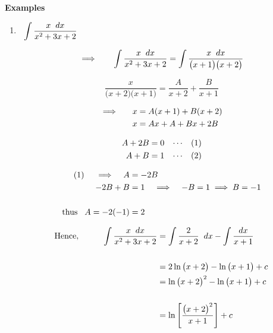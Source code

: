 \documentclass[11pt,a4paper]{article}
\begin{document}
\textbf{Examples}
\begin{enumerate}
\item $\hspace{0.2cm}\displaystyle{\int \dfrac{x\hspace{0.2cm}dx}{x^2 + 3x + 2}}$

$$\implies \hspace{0.6cm} \int \dfrac{x\hspace{0.2cm}dx}{x^2 + 3x + 2} = \int \dfrac{x\hspace{0.2cm}dx}{\big( x + 1\big)\big( x + 2\big)}$$

$$\dfrac{x}{\big(x + 2\big)\big(x + 1\big)} = \dfrac{A}{x + 2} + \dfrac{B}{x + 1}$$


\begin{align*}
\implies\hspace{0.5cm} x & = A(x+1) + B(x+ 2)\\
x & = Ax + A + Bx + 2B
\end{align*}


\begin{align*}
A + 2B & = 0\hspace{0.3cm} \cdots\hspace{0.3cm} (1)\\
A + B & = 1\hspace{0.3cm} \cdots\hspace{0.3cm} (2)
\end{align*}


\begin{align*}
(1)\hspace{0.4cm} \implies\hspace{0.3cm} A & = -2B\\
-2B + B & = 1\hspace{0.3cm} \implies\hspace{0.3cm} -B = 1\implies B = -1\\\\
\text{thus}\hspace{0.3cm} A = -2(-1) & = 2
\end{align*}





\begin{align*}
\text{Hence},\hspace{1cm} \int \dfrac{x\hspace{0.2cm}dx}{x^2 + 3x + 2} & = \int \dfrac{2}{x + 2} \hspace{0.2cm}dx - \int \dfrac{dx}{x + 1}\\\\
& = 2\ln \big( x + 2\big) - \ln \big(x + 1\big) + c\\
& = \ln \big(x + 2\big)^2 - \ln \big(x + 1\big) + c\\\\
& = \ln \Bigg[\dfrac{\big(x + 2\big)^2}{x + 1}\Bigg] + c\\\\
\end{align*}





\end{enumerate}
\end{document}
